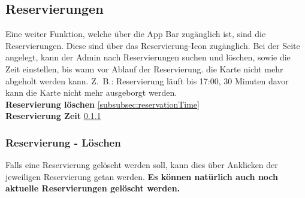 \newpage

\subsection{Reservierungen}
Eine weiter Funktion, welche über die App Bar zugänglich ist, sind die Reservierungen. Diese sind über das Reservierung-Icon zugänglich. Bei der Seite angelegt, kann der Admin nach Reservierungen suchen und löschen, sowie die Zeit einstellen, bis wann vor Ablauf der Reservierung. die Karte nicht mehr abgeholt werden kann. Z. B.: Reservierung läuft bis 17:00, 30 Minuten davor kann die Karte nicht mehr ausgeborgt werden.
\vspace{5cm}
\\
\vspace{5cm}
\textbf{Reservierung löschen} \ref{subsubsec:reservationTime}
\\
\vspace{5cm}
\textbf{Reservierung Zeit} \ref{subsubsec:deleteReservation}

\newpage

\subsubsection{Reservierung - Löschen} \label{subsubsec:deleteReservation}
Falls eine Reservierung gelöscht werden soll, kann dies über Anklicken der jeweiligen Reservierung getan werden. \textbf{Es können natürlich auch noch aktuelle Reservierungen gelöscht werden.}

